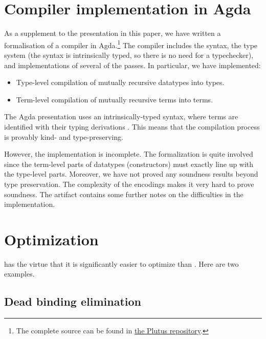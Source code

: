 






\section{Compiler implementation in Agda}
\label{sec:compiler}

As a supplement to the presentation in this paper, we have written a
formalisation of a \FIR{} compiler in Agda.\footnote{The complete source can be found
  in \href{\sourceUrl}{the Plutus repository}.}
The compiler includes the syntax, the type
system (the syntax is intrinsically typed, so there is no need for a
typechecker), and implementations of several of the passes. In particular, we
have implemented:
\begin{itemize}
  \item Type-level compilation of mutually recursive datatypes into \FOMF{} types.
  \item Term-level compilation of mutually recursive terms into \FOMF{} terms.
\end{itemize}

\noindent The Agda presentation uses an intrinsically-typed syntax, where
terms are identified with their typing derivations \cite{altenkirch.reus:welltyped}. This means that the
compilation process is provably kind- and type-preserving.

However, the implementation is incomplete. The formalization is quite involved
since the term-level parts of datatypes (constructors) must exactly line up with
the type-level parts. Moreover, we have not proved any soundness results beyond
type preservation. The complexity of the encodings makes it very hard to
prove soundness. The artifact contains some further notes on the difficulties in the implementation.

\section{Optimization}

\FIR{} has the virtue that it is significantly easier to optimize than
\FOMF{}. Here are two examples.

\subsection{Dead binding elimination}


